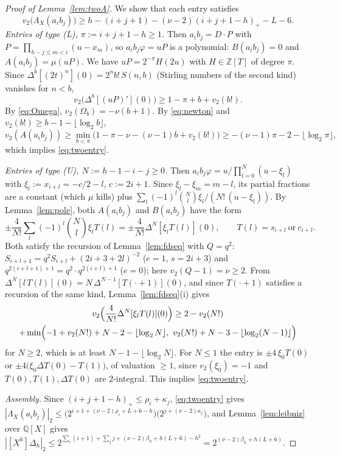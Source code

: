 \documentclass[11pt]{amsart}
\theoremstyle{definition}
\theoremstyle{remark}
\numberwithin{equation}{section}
\newcommand{\ZZ}{\mathbb{Z}}
\newcommand{\QQ}{\mathbb{Q}}
\begin{document}
\begin{proof}[Proof of Lemma~\ref{lem:twoA}]
We show that each entry satisfies
\begin{equation}\label{eq:twoentry}
  v_2\bigl(\Lambda_X(a_ib_j)\bigr)\ge h-(i+j+1)-(\nu-2)(i+j+1-h)_+-L-6 .
\end{equation}
\emph{Entries of type (L), $\pi:=i+j+1-h\ge1$.} Then $a_ib_j=D\cdot P$ with $P=\prod_{h-j\le m<i}(u-x_m)$, so $a_ib_j\varphi=uP$
is a polynomial: $B(a_ib_j)=0$ and $A(a_ib_j)=\mu(uP)$. We have $uP=2^{-\pi}H(2u)$ with $H\in\ZZ[T]$ of degree $\pi$.
Since $\Delta^b[(2t)^n](0)=2^nb!\,S(n,b)$ (Stirling numbers of the second kind) vanishes for $n<b$,
\begin{equation}\label{eq:Lnewton}
  v_2\bigl(\Delta^b[(uP)'](0)\bigr)\ge1-\pi+b+v_2(b!).
\end{equation}
By \eqref{eq:Omega}, $v_2(\Omega_b)=-\nu(b+1)$. By \eqref{eq:newton} and $v_2(b!)\ge b-1-\lfloor\log_2b\rfloor$,
\[
  v_2(A(a_ib_j))\ge\min_{b<\pi}\bigl(1-\pi-\nu-(\nu-1)b+v_2(b!)\bigr)\ge-(\nu-1)\pi-2-\lfloor\log_2\pi\rfloor ,
\]
which implies \eqref{eq:twoentry}.

\emph{Entries of type (U), $N:=h-1-i-j\ge0$.} Then $a_ib_j\varphi=u/\prod_{l=0}^{N}(u-\xi_l)$ with $\xi_l:=x_{i+l}=-c/2-l$,
$c:=2i+1$. Since $\xi_l-\xi_m=m-l$, its partial fractions are a constant (which $\mu$ kills) plus
$\sum_l(-1)^l\binom Nl\xi_l/(N!\,(u-\xi_l))$. By Lemma~\ref{lem:pole}, both $A(a_ib_j)$ and $B(a_ib_j)$ have the form
\begin{equation}\label{eq:Uentry}
  \pm\frac4{N!}\sum_l(-1)^l\binom Nl\xi_lT(l)=\pm\frac4{N!}\Delta^N[\xi_lT(l)](0),\qquad T(l)=s_{i+l}\ \text{or}\ c_{i+l}.
\end{equation}
Both satisfy the recursion of Lemma~\ref{lem:fdseq} with $Q=q^2$: $S_{i+l+1}=q^2S_{i+l}+(2i+3+2l)^{-2}$ ($e=1$,
$s=2i+3$) and $q^{2(i+l+1)+1}=q^2\cdot q^{2(i+l)+1}$ ($e=0$); here $v_2(Q-1)=\nu\ge2$. From
$\Delta^N[l\,T(l)](0)=N\,\Delta^{N-1}[T(\cdot+1)](0)$, and since $T(\cdot+1)$ satisfies a recursion of the same kind,
Lemma~\ref{lem:fdseq}(i) gives
\begin{multline*}
  v_2\Bigl(\frac4{N!}\Delta^N[\xi_lT(l)](0)\Bigr)\ge2-v_2(N!)\\
  +\min\Bigl(-1+v_2(N!)+N-2-\lfloor\log_2N\rfloor,\ v_2(N!)+N-3-\lfloor\log_2(N-1)\rfloor\Bigr)
\end{multline*}
for $N\ge2$, which is at least $N-1-\lfloor\log_2N\rfloor$. For $N\le1$ the entry is $\pm4\,\xi_0T(0)$ or
$\pm4\bigl(\xi_0\Delta T(0)-T(1)\bigr)$, of valuation $\ge1$, since $v_2(\xi_0)=-1$ and $T(0),T(1),\Delta T(0)$ are
$2$-integral. This implies \eqref{eq:twoentry}.

\emph{Assembly.} Since $(i+j+1-h)_+\le\rho_i+\kappa_j$, \eqref{eq:twoentry} gives
$|\Lambda_X(a_ib_j)|_2\le\bigl(2^{i+1+(\nu-2)\rho_i+L+6-h}\bigr)\bigl(2^{j+(\nu-2)\kappa_j}\bigr)$, and
Lemma~\ref{lem:leibniz} over $\QQ[X]$ gives
$|[X^k]\Delta_h|_2\le2^{\sum_i(i+1)+\sum_jj+(\nu-2)\beta_h+h(L+6)-h^2}=2^{(\nu-2)\beta_h+h(L+6)}$.
\end{proof}
\end{document}
